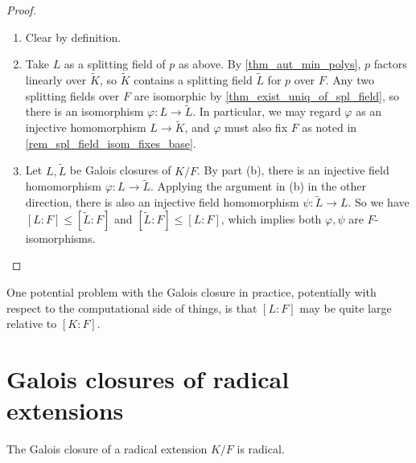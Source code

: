 \begin{proof}~
    \begin{enumerate}[label=(\alph*)]
        \item Clear by definition.
        \item Take $L$ as a splitting field of $p$ as above. By \cref{thm_aut_min_polys}, $p$ factors linearly over $\widetilde{K}$, so $\widetilde{K}$ contains a splitting field $\widetilde{L}$ for $p$ over $F$. Any two splitting fields over $F$ are isomorphic by \cref{thm_exist_uniq_of_spl_field}, so there is an isomorphism $\varphi: L \to \widetilde{L}$. In particular, we may regard $\varphi$ as an injective homomorphism $L \to \widetilde{K}$, and $\varphi$ must also fix $F$ as noted in \cref{rem_spl_field_isom_fixes_base}.
        \item Let $L, \widetilde{L}$ be Galois closures of $K/F$. By part (b), there is an injective field homomorphism $\varphi: L \to \widetilde{L}$. Applying the argument in (b) in the other direction, there is also an injective field homomorphism $\psi: \widetilde{L} \to L$. So we have $[L : F] \leq [\widetilde{L} : F]$ and $[\widetilde{L} : F] \leq [L : F]$, which implies both $\varphi, \psi$ are $F$-isomorphisms. \qedhere
    \end{enumerate}
\end{proof}

\begin{remark}
    One potential problem with the Galois closure in practice, potentially with respect to the computational side of things, is that $[L : F]$ may be quite large relative to $[K : F]$.
\end{remark}

\section{Galois closures of radical extensions}

\begin{proposition}
    The Galois closure of a radical extension $K/F$ is radical.
\end{proposition}

